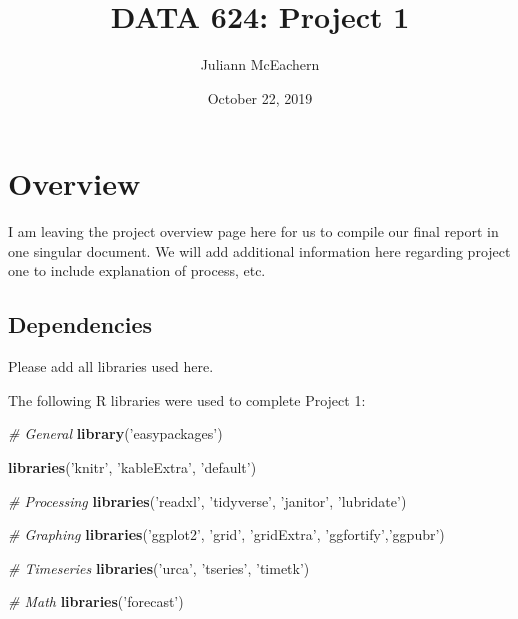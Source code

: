 \documentclass[openany]{book}
\title{DATA 624: Project 1}
\author{Juliann McEachern}
\date{October 22, 2019}
\newenvironment{Shaded}{\begin{snugshade}}{\end{snugshade}}
\newcommand{\CommentTok}[1]{\textcolor[rgb]{0.56,0.35,0.01}{\textit{#1}}}
\newcommand{\KeywordTok}[1]{\textcolor[rgb]{0.13,0.29,0.53}{\textbf{#1}}}
\newcommand{\NormalTok}[1]{#1}
\newcommand{\StringTok}[1]{\textcolor[rgb]{0.31,0.60,0.02}{#1}}
\renewenvironment{quote}{\begin{myquote}}{\end{myquote}}
\begin{document}
\maketitle

{
\setcounter{tocdepth}{1}
\tableofcontents
}
\hypertarget{overview}{%
\chapter*{Overview}\label{overview}}

\begin{quote}
I am leaving the project overview page here for us to compile our final
report in one singular document. We will add additional information here
regarding project one to include explanation of process, etc.
\end{quote}

\hypertarget{dependencies}{%
\section*{Dependencies}\label{dependencies}}

\begin{quote}
Please add all libraries used here.
\end{quote}

The following R libraries were used to complete Project 1:

\begin{Shaded}
\begin{Highlighting}[]
\CommentTok{# General}
\KeywordTok{library}\NormalTok{(}\StringTok{'easypackages'}\NormalTok{)}

\KeywordTok{libraries}\NormalTok{(}\StringTok{'knitr'}\NormalTok{, }\StringTok{'kableExtra'}\NormalTok{, }\StringTok{'default'}\NormalTok{)}

\CommentTok{# Processing}
\KeywordTok{libraries}\NormalTok{(}\StringTok{'readxl'}\NormalTok{, }\StringTok{'tidyverse'}\NormalTok{, }\StringTok{'janitor'}\NormalTok{, }\StringTok{'lubridate'}\NormalTok{)}

\CommentTok{# Graphing}
\KeywordTok{libraries}\NormalTok{(}\StringTok{'ggplot2'}\NormalTok{, }\StringTok{'grid'}\NormalTok{, }\StringTok{'gridExtra'}\NormalTok{, }\StringTok{'ggfortify'}\NormalTok{,}\StringTok{'ggpubr'}\NormalTok{)}

\CommentTok{# Timeseries }
\KeywordTok{libraries}\NormalTok{(}\StringTok{'urca'}\NormalTok{, }\StringTok{'tseries'}\NormalTok{, }\StringTok{'timetk'}\NormalTok{)}

\CommentTok{# Math}
\KeywordTok{libraries}\NormalTok{(}\StringTok{'forecast'}\NormalTok{)}
\end{Highlighting}
\end{Shaded}
\end{document}
